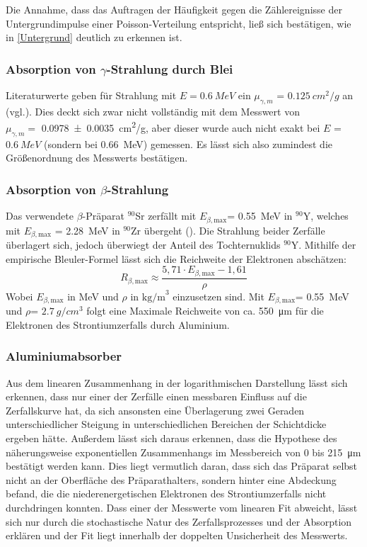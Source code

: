 \documentclass[
	a4paper,
	12pt,
	pagesize,
	ngerman
]{scrartcl}
\begin{document}
	Die Annahme, dass das Auftragen der Häufigkeit gegen die Zählereignisse der Untergrundimpulse einer Poisson-Verteilung entspricht, ließ sich bestätigen, wie in \cref{Untergrund} deutlich zu erkennen ist.
	
	\subsubsection{Absorption von $\gamma$-Strahlung durch Blei}
	Literaturwerte geben für Strahlung mit $E=\SI{0,6}{MeV}$ ein $\mu_{\gamma,m}$ = $\SI{0,125}{cm^2/g}$ an (vgl.\cite{absorption_blei}).
	Dies deckt sich zwar nicht vollständig mit dem Messwert von \\
	$\mu_{\gamma,m} = $ \SI{0,0978 \pm 0,0035}{cm^2/g}, 
	aber dieser wurde auch nicht exakt bei $E$ = $\SI{0,6}{MeV}$ (sondern bei \SI{0,66}{MeV}) gemessen.
	Es lässt sich also zumindest die Größenordnung des Messwerts bestätigen.
	
	\subsubsection{Absorption von $\beta$-Strahlung}
	Das verwendete $\beta$-Präparat $^{90}$Sr zerfällt mit $E_{\beta,\text{max}}$= \SI{0,55}{MeV} in $^{90}$Y, welches mit $E_{\beta,\text{max}}$ = \SI{2,28}{MeV} in $^{90}$Zr übergeht (\cite{Einfuehrung}).
	Die Strahlung beider Zerfälle überlagert sich, jedoch überwiegt der Anteil des Tochternuklids $^{90}$Y. 
	Mithilfe der empirische Bleuler-Formel lässt sich die Reichweite der Elektronen abschätzen:
	\begin{equation}
	R_{\beta,\text{max}} \approx \frac{5,71 \cdot E_{\beta,\text{max}} - 1,61}{\rho}
	\label{Bleuler}
	\end{equation} %
	Wobei $E_{\beta,\text{max}}$ in MeV und $\rho$ in $\text{kg/m}^3$ einzusetzen sind.
	Mit $E_{\beta,\text{max}}$= \SI{0,55}{MeV} und $\rho$= $\SI{2,7}{g/cm^3}$ folgt eine Maximale Reichweite von ca. \SI{550}{\micro\meter} für die Elektronen des Strontiumzerfalls durch Aluminium.
	
	\subsubsection*{Aluminiumabsorber}
	Aus dem linearen Zusammenhang in der logarithmischen Darstellung lässt sich erkennen, dass nur einer der Zerfälle einen messbaren Einfluss auf die Zerfallskurve hat, da sich ansonsten eine Überlagerung zwei Geraden unterschiedlicher Steigung in unterschiedlichen Bereichen der Schichtdicke ergeben hätte.
	Außerdem lässt sich daraus erkennen, dass die Hypothese des näherungsweise exponentiellen Zusammenhangs im Messbereich von 0 bis \SI{215}{\micro \meter} bestätigt werden kann.
	Dies liegt vermutlich daran, dass sich das Präparat selbst nicht an der Oberfläche des Präparathalters, sondern hinter eine Abdeckung befand, die die niederenergetischen Elektronen des Strontiumzerfalls nicht durchdringen konnten.
	Dass einer der Messwerte vom linearen Fit abweicht, lässt sich nur durch die stochastische Natur des Zerfallsprozesses und der Absorption erklären und der Fit liegt innerhalb der doppelten Unsicherheit des Messwerts.
	
\end{document}
